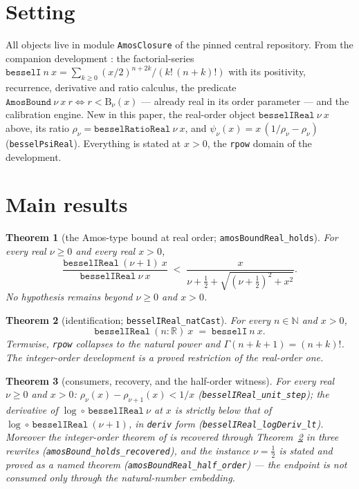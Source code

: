 \documentclass[11pt]{article}
\newtheorem{theorem}{Theorem}[section]
\newcommand{\lean}[1]{\texttt{#1}}
\newcommand{\RHS}{\mathrm{B}}
\begin{document}
\section{Setting}\label{sec:setting}

All objects live in module \lean{AmosClosure} of the pinned central
repository.  From the companion development
\cite{ErikssonC2,ErikssonC3}: the factorial-series
$\lean{besselI}\ n\ x = \sum_{k\ge0}(x/2)^{n+2k}/(k!\,(n+k)!)$ with
its positivity, recurrence, derivative and ratio calculus, the
predicate $\lean{AmosBound}\ \nu\ x\ r \iff r < \RHS_\nu(x)$ ---
already real in its order parameter --- and the calibration
engine.  New in this paper, the real-order object
$\lean{besselIReal}\ \nu\ x$ above, its ratio
$\rho_\nu = \lean{besselRatioReal}\ \nu\ x$, and
$\psi_\nu(x) = x\,(1/\rho_\nu - \rho_\nu)$
(\lean{besselPsiReal}).  Everything is stated at $x > 0$, the
\lean{rpow} domain of the development.

\section{Main results}\label{sec:results}

\begin{theorem}[the Amos-type bound at real order;
\lean{amosBoundReal\_holds}]\label{thm:main}
For every real $\nu \ge 0$ and every real $x > 0$,
\[
\frac{\lean{besselIReal}\ (\nu{+}1)\ x}{\lean{besselIReal}\ \nu\ x}
\;<\; \frac{x}{\nu+\tfrac12+\sqrt{(\nu+\tfrac12)^2+x^2}} .
\]
No hypothesis remains beyond $\nu \ge 0$ and $x > 0$.
\end{theorem}

\begin{theorem}[identification;
\lean{besselIReal\_natCast}]\label{thm:ident}
For every $n \in \mathbb{N}$ and $x > 0$,
\[
\lean{besselIReal}\ (n:\mathbb{R})\ x \;=\; \lean{besselI}\ n\ x .
\]
Termwise, \lean{rpow} collapses to the natural power and
$\Gamma(n+k+1) = (n+k)!$.  The integer-order development is a proved
restriction of the real-order one.
\end{theorem}

\begin{theorem}[consumers, recovery, and the half-order
witness]\label{thm:consumers}
For every real $\nu \ge 0$ and $x > 0$:
$\rho_\nu(x) - \rho_{\nu+1}(x) < 1/x$
(\lean{besselIReal\_unit\_step}); the derivative of
$\log \circ\, \lean{besselIReal}\ \nu$ at $x$ is strictly below that
of $\log \circ\, \lean{besselIReal}\ (\nu{+}1)$, in \lean{deriv}
form (\lean{besselIReal\_logDeriv\_lt}).  Moreover the integer-order
theorem of \cite{ErikssonC3} is recovered through
Theorem~\ref{thm:ident} in three rewrites
(\lean{amosBound\_holds\_recovered}), and the instance $\nu = \tfrac12$
is stated and proved as a named theorem
(\lean{amosBoundReal\_half\_order}) --- the endpoint is not consumed
only through the natural-number embedding.
\end{theorem}
\end{document}
